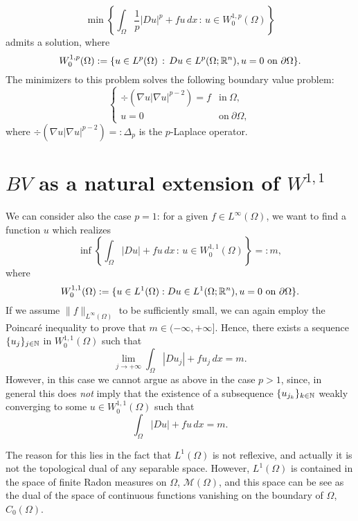 \begin{equation*}
\min \left \{ \int_{\Omega} \frac{1}{p} |D u|^{p} + f u \, dx \, : \, u \in W^{1, p}_{0}(\Omega) \right \}
\end{equation*}
admits a solution, where $$W^{1, p}_{0}(\Omega) := \{ u \in L^{p}(\Omega) \, : \, Du \in L^{p}(\Omega; \mathbb{R}^{n}), u = 0 \ \text{on} \ \partial \Omega\}.$$ 
The minimizers to this problem solves the following boundary value problem:
\begin{equation*}
\begin{cases} 
\div \left ( \nabla u |\nabla u|^{p - 2} \right ) = f & \text{in} \ \Omega, \\
u = 0 & \text{on} \ \partial \Omega,
\end{cases}
\end{equation*}
where $\div \left ( \nabla u |\nabla u|^{p - 2} \right ) =: \Delta_{p}$ is the $p$-Laplace operator.

\section*{$BV$ as a natural extension of $W^{1, 1}$}

We can consider also the case $p = 1$: for a given $f \in L^{\infty}(\Omega)$, we want to find a function $u$ which realizes
\begin{equation} \label{eq:min_probl_W_1}
\inf\left\{\int_\Omega |D u| + f u \, dx \,:\, u \in W^{1,1}_{0}(\Omega) \right\} =: m,
\end{equation}
where $$W^{1,1}_{0}(\Omega) := \{u \in L^1(\Omega) : Du \in L^1(\Omega; \mathbb{R}^n), u = 0 \ \text{on} \ \partial \Omega \}.$$
If we assume $\|f\|_{L^{\infty}(\Omega)}$ to be sufficiently small, we can again employ the Poincar\'e inequality to prove that $m \in (- \infty, + \infty]$. Hence, there exists a sequence $\{u_j \}_{j\in\mathbb{N}}$ in $W^{1,1}_{0}(\Omega)$ such that $$\lim_{j \to + \infty} \int_\Omega |D u_{j}| + f u_{j} \, dx = m.$$ 
However, in this case we cannot argue as above in the case $p > 1$, since, in general this does \emph{not} imply that the existence of a subsequence $\{u_{j_k}\}_{k\in\mathbb{N}}$ weakly converging to some $u \in W^{1,1}_{0}(\Omega)$ such that $$\int_\Omega |D u| + f u \, dx = m.$$ 

The reason for this lies in the fact that $L^1(\Omega)$ is not reflexive, and actually it is not the topological dual of any separable space. However, $L^{1}(\Omega)$ is contained in the space of finite Radon measures on $\Omega$, $\mathcal{M}(\Omega)$, and this space can be see as the dual of the space of continuous functions vanishing on the boundary of $\Omega$, $C_{0}(\Omega)$.

